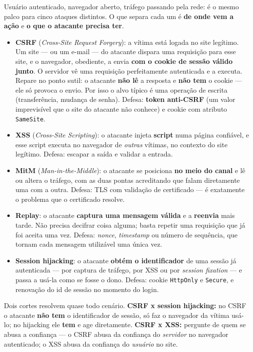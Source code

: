 \begin{conceito}
Usuário autenticado, navegador aberto, tráfego passando pela rede: é o
mesmo palco para cinco ataques distintos. O que separa cada um é
\textbf{de onde vem a ação} e \textbf{o que o atacante precisa ter}.

\begin{itemize}
\item \textbf{CSRF} (\textit{Cross-Site Request Forgery}): a vítima está
logada no site legítimo. Um site --- ou um e-mail --- do atacante dispara
uma requisição para esse site, e o navegador, obediente, a envia
\textbf{com o cookie de sessão válido junto}. O servidor vê uma requisição
perfeitamente autenticada e a executa. Repare no ponto sutil: o atacante
\textbf{não lê} a resposta e \textbf{não tem} o cookie --- ele só provoca o
envio. Por isso o alvo típico é uma operação de escrita (transferência,
mudança de senha). Defesa: \textbf{token anti-CSRF} (um valor imprevisível
que o site do atacante não conhece) e cookie com atributo
\texttt{SameSite}.
\item \textbf{XSS} (\textit{Cross-Site Scripting}): o atacante injeta
\textbf{script} numa página confiável, e esse script executa no navegador
de \emph{outras} vítimas, no contexto do site legítimo. Defesa: escapar a
saída e validar a entrada.
\item \textbf{MitM} (\textit{Man-in-the-Middle}): o atacante se posiciona
\textbf{no meio do canal} e lê ou altera o tráfego, com as duas pontas
acreditando que falam diretamente uma com a outra. Defesa: TLS com
validação de certificado --- é exatamente o problema que o certificado
resolve.
\item \textbf{Replay}: o atacante \textbf{captura uma mensagem válida} e a
\textbf{reenvia} mais tarde. Não precisa decifrar coisa alguma; basta
repetir uma requisição que já foi aceita uma vez. Defesa: \textit{nonce},
\textit{timestamp} ou número de sequência, que tornam cada mensagem
utilizável uma única vez.
\item \textbf{Session hijacking}: o atacante \textbf{obtém o identificador}
de uma sessão já autenticada --- por captura de tráfego, por XSS ou por
\textit{session fixation} --- e passa a usá-la como se fosse o dono.
Defesa: cookie \texttt{HttpOnly} e \texttt{Secure}, e renovação do id de
sessão no momento do login.
\end{itemize}
\end{conceito}

\begin{regrapratica}
Dois cortes resolvem quase todo cenário. \textbf{CSRF x session hijacking:}
no CSRF o atacante \textbf{não tem} o identificador de sessão, só faz o
navegador da vítima usá-lo; no hijacking ele \textbf{tem} e age
diretamente. \textbf{CSRF x XSS:} pergunte de quem se abusa a confiança ---
o CSRF abusa da confiança do \emph{servidor} no navegador autenticado; o
XSS abusa da confiança do \emph{usuário} no site.
\end{regrapratica}

